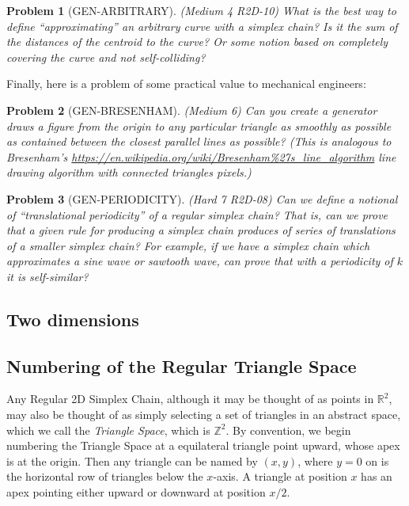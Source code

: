 \documentclass[11pt]{article}
\newtheorem{problem}{Problem}
\begin{document}
\begin{problem}[GEN-ARBITRARY]
(Medium 4 R2D-10) What is the best way to define ``approximating'' an arbitrary  curve with a simplex chain? Is it the sum of the distances of the centroid to the curve?
  Or some notion based on completely covering the curve and not self-colliding?  
\end{problem}

Finally, here is a problem of some practical value to mechanical engineers:
\begin{problem}[GEN-BRESENHAM]
  (Medium 6) Can you create a generator draws a figure from the origin to any particular triangle as smoothly as possible as contained
  between the closest parallel lines as possible? (This is analogous to Bresenham's \url{https://en.wikipedia.org/wiki/Bresenham%27s_line_algorithm}
    line drawing algorithm with connected triangles pixels.)
\end{problem}

\begin{problem}[GEN-PERIODICITY]
(Hard 7 R2D-08) Can we define a notional of ``translational periodicity'' of a regular simplex chain? That is, can we prove that
  a given rule for producing a simplex chain produces of series of translations of a smaller simplex chain? For example,
  if we have a simplex chain which approximates a sine wave or sawtooth wave, can prove that with a periodicity of $k$ it
  is self-similar?  
\end{problem}

\subsection{Two dimensions}

\subsection{Numbering of the Regular Triangle Space}

Any Regular 2D Simplex Chain, although it may be thought of as points in $\mathbb{R}^2$, may also be thought of as simply
selecting a set of triangles in an abstract space, which we call the {\em Triangle Space}, which is $\mathbb{Z}^2$. By convention,
we begin numbering the Triangle Space at a equilateral triangle point upward, whose apex is at the origin.  Then any triangle can be
named by $(x,y)$, where $y=0$ on is the horizontal row of triangles below the $x$-axis. A triangle at position $x$ has an apex
pointing either upward or downward at position $x/2$.
\end{document}
